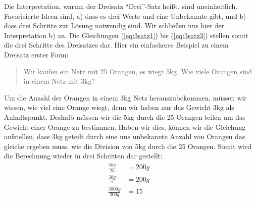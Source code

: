 Die Interpretation, warum der Dreisatz "`Drei"'-Satz heißt, sind uneinheitlich. Favorisierte Ideen sind, a) dass es drei Werte und eine Unbekannte gibt, und b) dass drei Schritte zur Lösung notwendig sind. Wir schließen uns hier der Interpretation b) an. Die Gleichungen (\ref{eq:3satz1}) bis (\ref{eq:3satz3}) stellen somit die drei Schritte des Dreisatzes dar. Hier ein einfacheres Beispiel zu einem Dreisatz erster Form:

\begin{quote}
Wir kaufen ein Netz mit 25 Orangen, es wiegt 5kg. Wie viele Orangen sind in einem Netz mit 3kg?
\end{quote}
Um die Anzahl der Orangen in einem 3kg Netz herauszubekommen, müssen wir wissen, wie viel eine Orange wiegt, denn wir haben nur das Gewicht 3kg als Anhaltspunkt. Deshalb müssen wir die 5kg durch die 25 Orangen teilen um das Gewicht einer Orange zu bestimmen. Haben wir dies, können wir die Gleichung aufstellen, dass 3kg geteilt durch eine uns unbekannte Anzahl von Orangen das gleiche ergeben muss, wie die Division von 5kg durch die 25 Orangen. Somit wird die Berechnung wieder in drei Schritten dar gestellt:
\begin{equation*}
\begin{split}
\frac{5kg}{25} &=  200g \\
\frac{3kg}{?} &= 200g \\
\frac{3000g}{200g} &= 15
\end{split}
\end{equation*}


